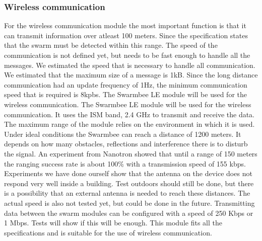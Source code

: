 \documentclass[10pt,a4paper]{article}
\begin{document}
\subsubsection{Wireless communication}

For the wireless communication module the most important function is that it can transmit information over atleast 100 meters. Since the specification states that the swarm must be detected within this range. The speed of the communication is not defined yet, but needs to be fast enough to handle all the messages. We estimated the speed that is necessary to handle all communication. We estimated that the maximum size of a message is 1kB. Since the long distance communication had an update frequency of 1Hz, the minimum communication speed that is required is 8kpbs. The Swarmbee LE module will be used for the wireless communication. The Swarmbee LE module will be used for the wireless communication. It uses the ISM band, 2.4 GHz to transmit and receive the data. The maximum range of the module relies on the environment in which it is used. Under ideal conditions the Swarmbee can reach a distance of 1200 meters. It depends on how many obstacles, reflections and interference there is to disturb the signal. An experiment from Nanotron showed that until a range of 150 meters the ranging success rate is about 100\% with a transmission speed of 155 kbps. Experiments we have done ourself show that the antenna on the device does not respond very well inside a building. Test outdoors should still be done, but there is a possibility that an external antenna is needed to reach these distances. The actual speed is also not tested yet, but could be done in the future. Transmitting data between the swarm modules can be configured with a speed of 250 Kbps or 1 Mbps. Tests will show if this will be enough. This module fits all the specifications and is suitable for the use of wireless communication.
\end{document}
